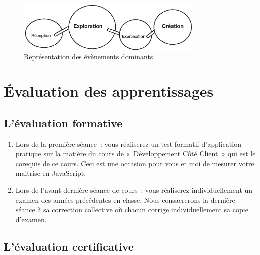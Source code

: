 \begin{figure}[H]
    \begin{center}
        \includegraphics[width=0.8\textwidth]{figures/EAEs.eps}
        \caption{Représentation des évènements dominants}
    \end{center}
\end{figure}
\clearpage
\clearpage

\section{Évaluation des apprentissages}
\subsection{L’évaluation formative}
\label{eval_formative}
\begin{enumerate}
    \item Lors de la première séance~: vous réaliserez un test formatif d’application pratique sur la matière du cours de «~Développement Côté Client~» qui est le corequis de ce cours. Ceci est une occasion pour vous et moi de mesurer votre maitrise en JavaScript.
    \item Lors de l'avant-dernière séance de cours~: vous réaliserez individuellement un examen des années précédentes en classe. Nous consacrerons la dernière séance à sa correction collective où chacun corrige individuellement sa copie d'examen.
\end{enumerate}

\subsection{L’évaluation certificative}

